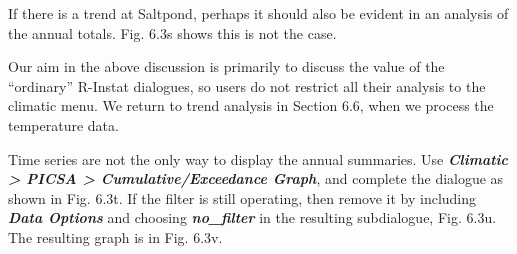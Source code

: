 \documentclass[
  letterpaper,
  DIV=11,
  numbers=noendperiod]{scrreprt}
\begin{document}
If there is a trend at Saltpond, perhaps it should also be evident in an
analysis of the annual totals. Fig. 6.3s shows this is not the case.

Our aim in the above discussion is primarily to discuss the value of the
``ordinary'' R-Instat dialogues, so users do not restrict all their
analysis to the climatic menu. We return to trend analysis in Section
6.6, when we process the temperature data.

Time series are not the only way to display the annual summaries. Use
\textbf{\emph{Climatic \textgreater{} PICSA \textgreater{}
Cumulative/Exceedance Graph}}, and complete the dialogue as shown in
Fig. 6.3t. If the filter is still operating, then remove it by including
\textbf{\emph{Data Options}} and choosing \textbf{\emph{no\_filter}} in
the resulting subdialogue, Fig. 6.3u. The resulting graph is in Fig.
6.3v.
\end{document}
